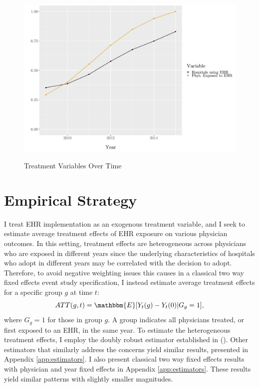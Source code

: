 \documentclass[11pt]{article}
\begin{document}
\begin{figure}[t]
\centering
\captionsetup{width=.45\linewidth}
    \caption{Treatment Variables Over Time}
    \includegraphics[scale=.45]{Objects/sum_stats_year.pdf}
    \label{fig:treatmentgraph}
\end{figure}



\section{Empirical Strategy}

I treat EHR implementation as an exogenous treatment variable, and I seek to estimate average treatment effects of EHR exposure on various physician outcomes. In this setting, treatment effects are heterogeneous across physicians who are exposed in different years since the underlying characteristics of hospitals who adopt in different years may be correlated with the decision to adopt. Therefore, to avoid negative weighting issues this causes in a classical two way fixed effects event study specification, I instead estimate average treatment effects for a specific group $g$ at time $t$: 
$$ATT(g,t)=\mathbbm{E}[Y_t(g)-Y_t(0)|G_g=1],$$
where $G_g=1$ for those in group $g$. A group indicates all physicians treated, or first exposed to an EHR, in the same year. To estimate the heterogeneous treatment effects, I employ the doubly robust estimator established in \citeauthor{callaway2021difference} (\citeyear{callaway2021difference}). Other estimators that similarly address the concerns yield similar results, presented in Appendix \ref{app:estimators}. I also present classical two way fixed effects results with physician and year fixed effects in Appendix \ref{app:estimators}. These results yield similar patterns with slightly smaller magnitudes. 
\end{document}
